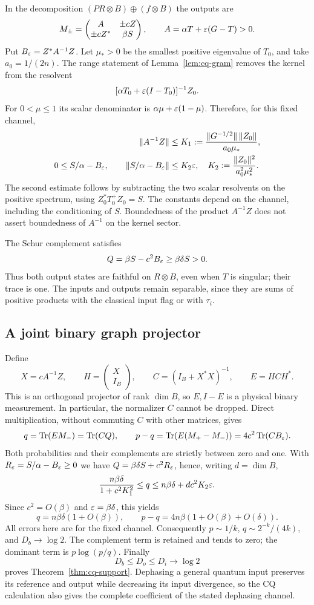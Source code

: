 In the decomposition $(PR\otimes B)\oplus(f\otimes B)$ the outputs are
\[
 M_\pm=\begin{pmatrix}A&\pm cZ\\\pm cZ^*&\beta S\end{pmatrix},
 \qquad A=\alpha T+\varepsilon(G-T)>0.
\]
Put $B_\varepsilon=Z^*A^{-1}Z$. Let $\mu_*>0$ be the smallest positive eigenvalue of $T_0$, and take $a_0=1/(2n)$. The range statement of Lemma~\ref{lem:cq-gram} removes the kernel from the resolvent
\[
 [\alpha T_0+\varepsilon(I-T_0)]^{-1}Z_0.
\]
For $0<\mu\leq1$ its scalar denominator is $\alpha\mu+\varepsilon(1-\mu)$. Therefore, for this fixed channel,
\begin{align*}
 \|A^{-1}Z\|&\leq K_1
   :=\frac{\|G^{-1/2}\|\,\|Z_0\|}{a_0\mu_*},\\
 0\leq S/\alpha-B_\varepsilon,\qquad
 \|S/\alpha-B_\varepsilon\|&\leq K_2\varepsilon,
 \quad K_2:=\frac{\|Z_0\|^2}{a_0^2\mu_*^2}.
\end{align*}
The second estimate follows by subtracting the two scalar resolvents on the positive spectrum, using $Z_0^*T_0^+Z_0=S$. The constants depend on the channel, including the conditioning of $S$. Boundedness of the product $A^{-1}Z$ does not assert boundedness of $A^{-1}$ on the kernel sector.

The Schur complement satisfies
\[
 Q=\beta S-c^2B_\varepsilon\geq\beta\delta S>0.
\]
Thus both output states are faithful on $R\otimes B$, even when $T$ is singular; their trace is one. The inputs and outputs remain separable, since they are sums of positive products with the classical input flag or with $\tau_i$.

\subsection{A joint binary graph projector}
Define
\[
 X=cA^{-1}Z,\qquad H=\begin{pmatrix}X\\I_B\end{pmatrix},
 \qquad C=(I_B+X^*X)^{-1},\qquad E=HCH^*.
\]
This is an orthogonal projector of rank $\dim B$, so $E,I-E$ is a physical binary measurement. In particular, the normalizer $C$ cannot be dropped. Direct multiplication, without commuting $C$ with other matrices, gives
\[
 q=\operatorname{Tr}(EM_-)=\operatorname{Tr}(CQ),\qquad
 p-q=\operatorname{Tr}(E(M_+-M_-))=4c^2\operatorname{Tr}(CB_\varepsilon).
\]
Both probabilities and their complements are strictly between zero and one. With $R_\varepsilon=S/\alpha-B_\varepsilon\geq0$ we have $Q=\beta\delta S+c^2R_\varepsilon$, hence, writing $d=\dim B$,
\[
 \frac{n\beta\delta}{1+c^2K_1^2}\leq q
 \leq n\beta\delta+d c^2K_2\varepsilon.
\]
Since $c^2=O(\beta)$ and $\varepsilon=\beta\delta$, this yields
\[
 q=n\beta\delta(1+O(\beta)),\qquad
 p-q=4n\beta(1+O(\beta)+O(\delta)).
\]
All errors here are for the fixed channel. Consequently $p\sim1/k$, $q\sim2^{-k}/(4k)$, and $D_b\to\log2$. The complement term is retained and tends to zero; the dominant term is $p\log(p/q)$. Finally
\[
 D_b\leq D_o\leq D_i\longrightarrow\log2
\]
proves Theorem~\ref{thm:cq-support}. Dephasing a general quantum input preserves its reference and output while decreasing its input divergence, so the CQ calculation also gives the complete coefficient of the stated dephasing channel.

